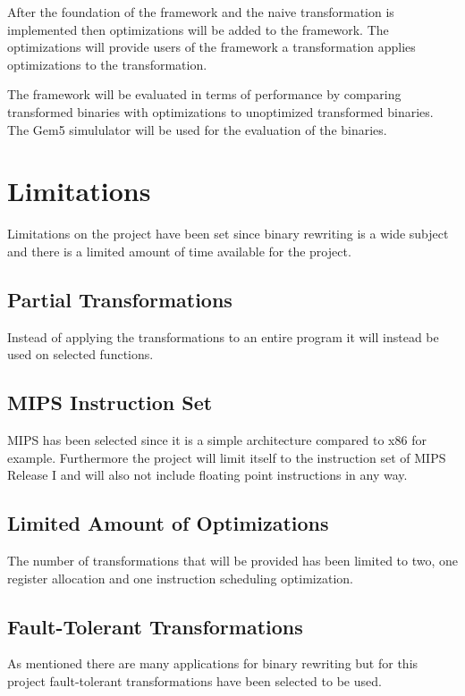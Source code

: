 After the foundation of the framework and the naive transformation
is implemented then optimizations will be added to the framework.
The optimizations will provide users of the framework a
transformation applies optimizations to the transformation.

The framework will be evaluated in terms of performance by
comparing transformed binaries with optimizations to
unoptimized transformed binaries. The Gem5 simululator will
be used for the evaluation of the binaries.

\section{Limitations}
Limitations on the project have been set since binary rewriting 
is a wide subject and there is a limited amount of time available
for the project.

\subsection{Partial Transformations}
Instead of applying the transformations to an entire program
it will instead be used on selected functions.

\subsection{MIPS Instruction Set}
MIPS has been selected since it is a simple architecture compared
to x86 for example. Furthermore the project will limit itself
to the instruction set of MIPS Release I and will also not
include floating point instructions in any way.  

\subsection{Limited Amount of Optimizations}
The number of transformations that will be provided has been
limited to two, one register allocation and one instruction
scheduling optimization.

\subsection{Fault-Tolerant Transformations}
As mentioned there are many applications for binary rewriting
but for this project fault-tolerant transformations have
been selected to be used. 


